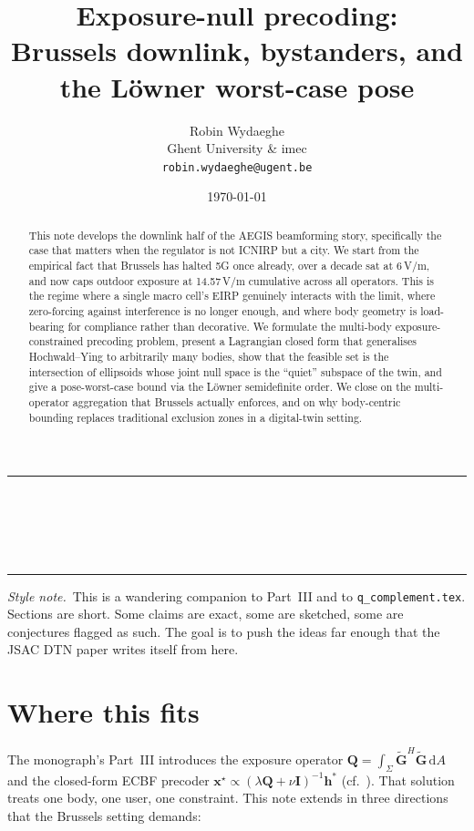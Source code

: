 \documentclass[11pt,a4paper]{article}
\title{\textbf{Exposure-null precoding:\\
Brussels downlink, bystanders, and the Löwner worst-case pose}}
\author{Robin Wydaeghe\\
 Ghent University \& imec\\
 \texttt{robin.wydaeghe@ugent.be}}
\date{\today}
\makeatletter
\theoremstyle{definition}
\newcommand{\xx}{\mathbf{x}}
\newcommand{\hh}{\mathbf{h}}
\newcommand{\ident}{\mathbf{I}}
\newcommand{\Q}{\mathbf{Q}}
\newcommand{\Gtil}{\tilde{\mathbf{G}}}
\newcommand{\diff}{\mathrm{d}}
\renewcommand{\maketitle}{%
  \thispagestyle{plain}%
  \begin{center}
    \rule{\linewidth}{1pt}\\[0.4em]
    {\LARGE\bfseries \@title}\\[0.5em]
    {\large \@author}\\[0.3em]
    {\small \@date}\\[0.4em]\rule{\linewidth}{1pt}
  \end{center}
  \vspace{0.5em}
}
\makeatother
\begin{document}
\maketitle

\begin{abstract}
This note develops the downlink half of the AEGIS beamforming story,
specifically the case that matters when the regulator is not ICNIRP
but a city. We start from the empirical fact that Brussels has halted
5G once already, over a decade sat at 6\,V/m, and now caps outdoor
exposure at 14.57\,V/m cumulative across all operators. This is the
regime where a single macro cell's EIRP genuinely interacts with the
limit, where zero-forcing against interference is no longer enough,
and where body geometry is load-bearing for compliance rather than
decorative. We formulate the multi-body exposure-constrained precoding
problem, present a Lagrangian closed form that generalises
Hochwald--Ying to arbitrarily many bodies, show that the feasible set
is the intersection of ellipsoids whose joint null space is the
``quiet'' subspace of the twin, and give a pose-worst-case bound via
the Löwner semidefinite order. We close on the multi-operator
aggregation that Brussels actually enforces, and on why body-centric
bounding replaces traditional exclusion zones in a digital-twin
setting.
\end{abstract}

\vspace{0.3em}
\noindent\textit{Style note.}~This is a wandering companion to
Part~III and to \texttt{q\_complement.tex}. Sections are short. Some
claims are exact, some are sketched, some are conjectures flagged as
such. The goal is to push the ideas far enough that the JSAC DTN
paper writes itself from here.

\tableofcontents
\bigskip

\section{Where this fits}

The monograph's Part~III introduces the exposure operator
$\Q=\int_\Sigma\Gtil^H\Gtil\,\diff A$ and the closed-form ECBF
precoder $\xx^\star\propto(\lambda\Q+\nu\ident)^{-1}\hh^*$
(cf.~\cite{Ying2015}).  That solution treats one body, one user, one
constraint. This note extends in three directions that the Brussels
setting demands:
\end{document}
